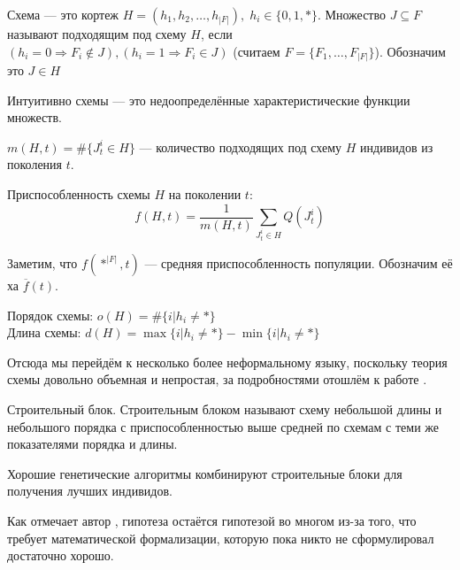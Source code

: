 \begin{definition}
    Схема --- это кортеж $H = (h_1, h_2, \ldots, h_{|F|}), \;h_i \in \{0, 1, *\}$. Множество $J \subseteq F$ называют подходящим под схему $H$, если $(h_i = 0 \Rightarrow F_i \notin J), (h_i = 1 \Rightarrow F_i \in J)$ (считаем $F = \{F_1, \ldots, F_{|F|}\}$). Обозначим это $J \in H$
\end{definition}
Интуитивно схемы --- это недоопределённые характеристические функции множеств.
\begin{definition}
    $m(H, t) = \#\{J_t^i \in H\}$ --- количество подходящих под схему $H$ индивидов из поколения $t$.
\end{definition}
\begin{definition}
    Приспособленность схемы $H$ на поколении $t$: $$f(H, t) = \frac{1}{m(H, t)}\sum_{J_t^i \in H}Q(J_t^i)$$
\end{definition}
Заметим, что $f(*^{|F|}, t)$ --- средняя приспособленность популяции. Обозначим её ха $\overline{f}(t)$.
\begin{definition}
    Порядок схемы: $o(H) = \#\{i|h_i \neq *\}$\\
    Длина схемы: $d(H) = \max\{i|h_i \neq *\} - \min\{i|h_i \neq *\}$
\end{definition}

Отсюда мы перейдём к несколько более неформальному языку, поскольку теория схемы довольно объемная и непростая, за подробностями отошлём к работе \cite{White14}.

\begin{definition}
    Строительный блок. Строительным блоком называют схему небольшой длины и небольшого порядка с приспособленностью выше средней по схемам с теми же показателями порядка и длины.
\end{definition}

\begin{hypothesis}
    Хорошие генетические алгоритмы комбинируют строительные блоки для получения лучших индивидов.
\end{hypothesis}

\begin{remark}
    Как отмечает автор \cite{White14}, гипотеза остаётся гипотезой во многом из-за того, что требует математической формализации, которую пока никто не сформулировал достаточно хорошо.
\end{remark}

